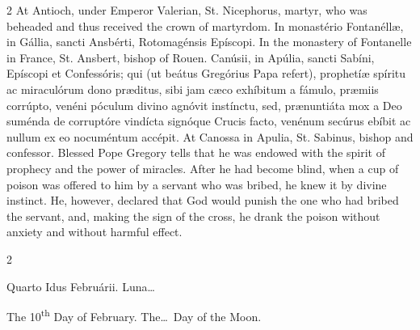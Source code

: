 \begin{paracol}{2}
\switchcolumn
{}
At Antioch, under Emperor Valerian, St. Nicephorus, martyr, who was beheaded 
 and thus received the crown of martyrdom.
\switchcolumn*
{}
In monastério Fontanéllæ, in Gállia, sancti 
 Ansbérti, Rotomagénsis Epíscopi.
\switchcolumn
{}
In the monastery of Fontanelle in France, St. Ansbert, bishop of Rouen.
\switchcolumn*
{}
Canúsii, in Apúlia, sancti Sabíni, Epíscopi et Confessóris; qui (ut beátus 
 Gregórius Papa refert), prophetíæ spíritu ac 
 miraculórum dono præditus, sibi jam cæco exhíbitum a fámulo, præmiis 
 corrúpto, venéni póculum divino agnóvit instínctu, sed, prænuntiáta mox a 
 Deo suménda de corruptóre vindícta signóque Crucis facto, venénum secúrus 
 ebíbit ac nullum ex eo nocuméntum accépit.
\switchcolumn
{}
At Canossa in Apulia, St. Sabinus, bishop and confessor. Blessed Pope 
 Gregory tells that he was endowed with the spirit of prophecy and the power 
 of miracles. After he had become blind, when a cup of poison was 
 offered to him by a servant who was bribed, he knew it by divine instinct. 
 He, however, declared that God would punish the one who had bribed the 
 servant, and, making the sign of the cross, he drank the poison without 
 anxiety and without harmful effect.
\switchcolumn*
{}
\end{paracol}


\begin{paracol}{2}
\begin{center}{\color{gregoriocolor} Quarto Idus Februárii. 
 Luna\dots\ }\end{center}
\switchcolumn
{}
\begin{center}{\color{gregoriocolor} The 10\textsuperscript{th} Day of 
 February. The\dots\ Day of the Moon.}\end{center}
\end{paracol}

